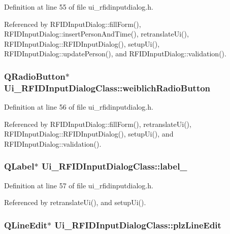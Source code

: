Definition at line 55 of file ui\_\-rfidinputdialog.h.

Referenced by RFIDInputDialog::fillForm(), RFIDInputDialog::insertPersonAndTime(), retranslateUi(), RFIDInputDialog::RFIDInputDialog(), setupUi(), RFIDInputDialog::updatePerson(), and RFIDInputDialog::validation().\hypertarget{class_ui___r_f_i_d_input_dialog_class_5e6931622decd2011e21bb494a941dba}{
\subsubsection[weiblichRadioButton]{\setlength{\rightskip}{0pt plus 5cm}QRadioButton$\ast$ {\bf Ui\_\-RFIDInputDialogClass::weiblichRadioButton}}}
\label{class_ui___r_f_i_d_input_dialog_class_5e6931622decd2011e21bb494a941dba}




Definition at line 56 of file ui\_\-rfidinputdialog.h.

Referenced by RFIDInputDialog::fillForm(), retranslateUi(), RFIDInputDialog::RFIDInputDialog(), setupUi(), and RFIDInputDialog::validation().\hypertarget{class_ui___r_f_i_d_input_dialog_class_96cd29530cfc6610bb23119b32edf886}{
\subsubsection[label\_\-4]{\setlength{\rightskip}{0pt plus 5cm}QLabel$\ast$ {\bf Ui\_\-RFIDInputDialogClass::label\_}}}
\label{class_ui___r_f_i_d_input_dialog_class_96cd29530cfc6610bb23119b32edf886}




Definition at line 57 of file ui\_\-rfidinputdialog.h.

Referenced by retranslateUi(), and setupUi().\hypertarget{class_ui___r_f_i_d_input_dialog_class_20e8b6974519d4510cf733992d8c2027}{
\subsubsection[plzLineEdit]{\setlength{\rightskip}{0pt plus 5cm}QLineEdit$\ast$ {\bf Ui\_\-RFIDInputDialogClass::plzLineEdit}}}
\label{class_ui___r_f_i_d_input_dialog_class_20e8b6974519d4510cf733992d8c2027}





